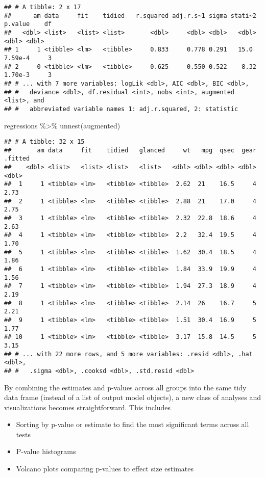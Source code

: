 \documentclass[
]{book}
\newenvironment{Shaded}{\begin{snugshade}}{\end{snugshade}}
\newcommand{\FunctionTok}[1]{\textcolor[rgb]{0.00,0.00,0.00}{#1}}
\newcommand{\NormalTok}[1]{#1}
\newcommand{\SpecialCharTok}[1]{\textcolor[rgb]{0.00,0.00,0.00}{#1}}
\providecommand{\tightlist}{%
  \setlength{\itemsep}{0pt}\setlength{\parskip}{0pt}}
\begin{document}
\begin{verbatim}
## # A tibble: 2 x 17
##      am data     fit    tidied   r.squared adj.r.s~1 sigma stati~2 p.value    df
##   <dbl> <list>   <list> <list>       <dbl>     <dbl> <dbl>   <dbl>   <dbl> <dbl>
## 1     1 <tibble> <lm>   <tibble>     0.833     0.778 0.291   15.0  7.59e-4     3
## 2     0 <tibble> <lm>   <tibble>     0.625     0.550 0.522    8.32 1.70e-3     3
## # ... with 7 more variables: logLik <dbl>, AIC <dbl>, BIC <dbl>,
## #   deviance <dbl>, df.residual <int>, nobs <int>, augmented <list>, and
## #   abbreviated variable names 1: adj.r.squared, 2: statistic
\end{verbatim}

\begin{Shaded}
\begin{Highlighting}[]
\NormalTok{regressions }\SpecialCharTok{\%\textgreater{}\%}
  \FunctionTok{unnest}\NormalTok{(augmented)}
\end{Highlighting}
\end{Shaded}

\begin{verbatim}
## # A tibble: 32 x 15
##       am data     fit    tidied   glanced     wt   mpg  qsec  gear .fitted
##    <dbl> <list>   <list> <list>   <list>   <dbl> <dbl> <dbl> <dbl>   <dbl>
##  1     1 <tibble> <lm>   <tibble> <tibble>  2.62  21    16.5     4    2.73
##  2     1 <tibble> <lm>   <tibble> <tibble>  2.88  21    17.0     4    2.75
##  3     1 <tibble> <lm>   <tibble> <tibble>  2.32  22.8  18.6     4    2.63
##  4     1 <tibble> <lm>   <tibble> <tibble>  2.2   32.4  19.5     4    1.70
##  5     1 <tibble> <lm>   <tibble> <tibble>  1.62  30.4  18.5     4    1.86
##  6     1 <tibble> <lm>   <tibble> <tibble>  1.84  33.9  19.9     4    1.56
##  7     1 <tibble> <lm>   <tibble> <tibble>  1.94  27.3  18.9     4    2.19
##  8     1 <tibble> <lm>   <tibble> <tibble>  2.14  26    16.7     5    2.21
##  9     1 <tibble> <lm>   <tibble> <tibble>  1.51  30.4  16.9     5    1.77
## 10     1 <tibble> <lm>   <tibble> <tibble>  3.17  15.8  14.5     5    3.15
## # ... with 22 more rows, and 5 more variables: .resid <dbl>, .hat <dbl>,
## #   .sigma <dbl>, .cooksd <dbl>, .std.resid <dbl>
\end{verbatim}

By combining the estimates and p-values across all groups into the same tidy data frame (instead of a list of output model objects), a new class of analyses and visualizations becomes straightforward. This includes

\begin{itemize}
\tightlist
\item
  Sorting by p-value or estimate to find the most significant terms across all tests
\item
  P-value histograms
\item
  Volcano plots comparing p-values to effect size estimates
\end{itemize}
\end{document}
